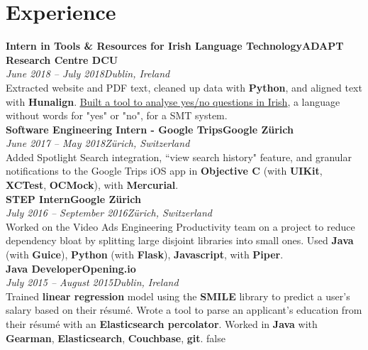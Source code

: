 \documentclass[a4paper, oneside, final]{scrartcl}
\newcommand{\nasc}[2]{\href{#1}{\color{blue}\setulcolor{blue}\ul{#2}}}
\newcommand{\bearna}[0]{\vspace{2.25mm}\\}
\newcommand{\fmtdate}[1]{\textit{#1}}
\newcommand{\fmtaddress}[1]{\textit{#1}}
\newcommand{\fmtjobtitle}[1]{\textbf{#1}}
\newcommand{\fmtskill}[1]{\textbf{#1}}
\begin{document}
\section{Experience}
\fmtjobtitle{Intern in Tools \& Resources for Irish Language Technology\hfill ADAPT Research Centre DCU}\\
\fmtdate{June 2018 -- July 2018}\hfill\fmtaddress{Dublin, Ireland}\\
Extracted website and PDF text, cleaned up data with \fmtskill{Python}, and aligned text with \fmtskill{Hunalign}. \nasc{http://mycode.doesnot.run/2018/08/15/yes-no/}{Built a tool to analyse yes/no questions in Irish}, a language without words for "yes" or "no", for a SMT system.
\bearna
\fmtjobtitle{Software Engineering Intern - Google Trips\hfill Google Zürich}\\
\fmtdate{June 2017 -- May 2018}\hfill\fmtaddress{Zürich, Switzerland}\\
Added Spotlight Search integration, ``view search history" feature, and granular notifications to the Google Trips iOS app in \fmtskill{Objective C} (with \fmtskill{UIKit}, \fmtskill{XCTest}, \fmtskill{OCMock}), with \fmtskill{Mercurial}.
\bearna
\fmtjobtitle{STEP Intern\hfill Google Zürich}\\
\fmtdate{July 2016 -- September 2016}\hfill\fmtaddress{Zürich, Switzerland}\\
Worked on the Video Ads Engineering Productivity team on a project to reduce dependency bloat by splitting large disjoint libraries into small ones. Used \fmtskill{Java} (with \fmtskill{Guice}), \fmtskill{Python} (with \fmtskill{Flask}), \fmtskill{Javascript}, with \fmtskill{Piper}.
\bearna
\fmtjobtitle{Java Developer\hfill Opening.io}\\
\fmtdate{July 2015 -- August 2015}\hfill\fmtaddress{Dublin, Ireland}\\
Trained \fmtskill{linear regression} model using the \fmtskill{SMILE} library to predict a user’s salary based on their résumé. Wrote a tool to parse an applicant's education from their résumé with an \fmtskill{Elasticsearch percolator}. Worked in \fmtskill{Java} with \fmtskill{Gearman}, \fmtskill{Elasticsearch}, \fmtskill{Couchbase}, \fmtskill{git}.
\if false
\bearna
{}
\end{document}
